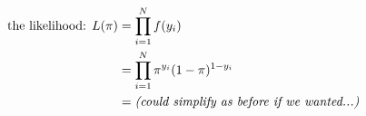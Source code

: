 \documentclass[border=3bp,varwidth=6.5in]{standalone}
\begin{document}
\color{mygreen}
\begin{align}
\text{the likelihood: } L(\pi)
  &= \prod_{i=1}^N f(y_i) \nonumber\\
  &= \prod_{i=1}^N \pi^{y_i} (1 - \pi)^{1 - y_i}\nonumber\\
  &= \text{\textit{(could simplify as before if we wanted...)}} \nonumber
\end{align}
\end{document}
